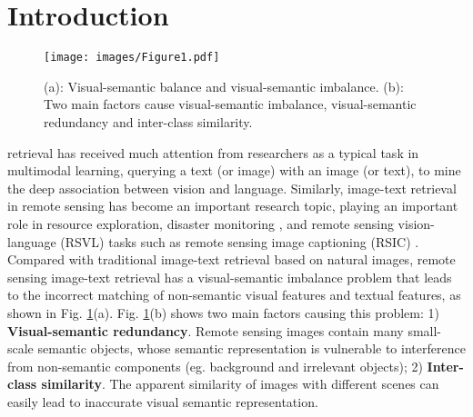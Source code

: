 \documentclass[journal]{IEEEtran}
\begin{document}
\section{Introduction}
\begin{figure}[htbp]
  \centering
  \texttt{[image: images/Figure1.pdf]}
  \caption{(a): Visual-semantic balance and visual-semantic imbalance. (b): Two main factors cause visual-semantic imbalance, visual-semantic redundancy and inter-class similarity.}
  \label{fig:fig1}
\end{figure}

 retrieval \cite{qu2021dynamic,zhang2022image} has received much attention from researchers as a typical task in multimodal learning, querying a text (or image) with an image (or text), to mine the deep association between vision and language. Similarly, image-text retrieval in remote sensing \cite{yuan2022remote,mi2022knowledge} has become an important research topic, playing an important role in resource exploration, disaster monitoring \cite{chi2016big, joyce2009review}, and remote sensing vision-language (RSVL) tasks such as remote sensing image captioning (RSIC) \cite{cheng2022nwpu, zhao2021high, liu2022remote}. Compared with traditional image-text retrieval based on natural images, remote sensing image-text retrieval has a visual-semantic imbalance problem that leads to the incorrect matching of non-semantic visual features and textual features, as shown in Fig. \ref{fig:fig1}(a). Fig. \ref{fig:fig1}(b) shows two main factors causing this problem: 1) \textbf{Visual-semantic redundancy}. Remote sensing images contain many small-scale semantic objects, whose semantic representation is vulnerable to interference from non-semantic components (eg. background and irrelevant objects); 2) \textbf{Inter-class similarity}. The apparent similarity of images with different scenes can easily lead to inaccurate visual semantic representation.
\end{document}
